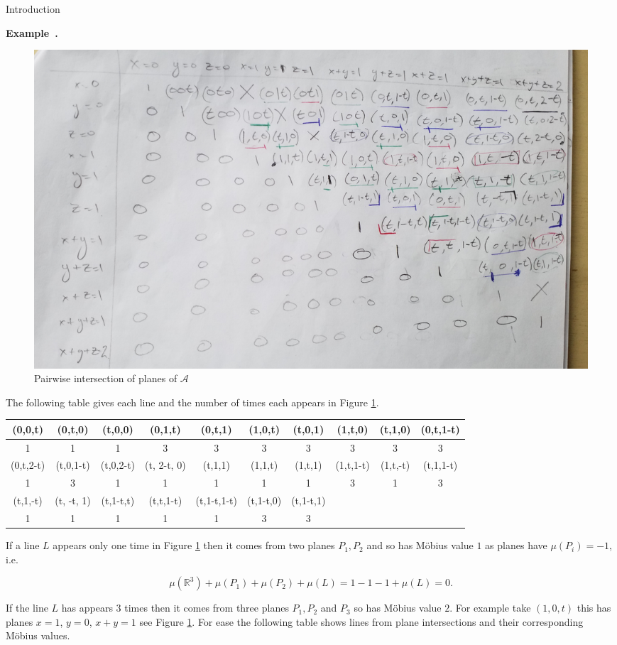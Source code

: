 \documentclass[a4paper,12pt]{article}
\newcounter{example}[]
\newenvironment{example}[1][]{\refstepcounter{example}\par\medskip
   \noindent \textbf{Example~\theexample. #1} \rmfamily}{\medskip}
\theoremstyle{definition}
\theoremstyle{indented}
\begin{document}
\begin{section}{Introduction}
\begin{example}
\begin{figure}[H]
    \centering
 \includegraphics[scale=0.10,angle=0]{29072020 pics/planesn4g1.jpg}  
    \caption{Pairwise intersection of planes of $\mathcal{A}$}
    \label{fig 2}
\end{figure}

The following table gives each line and the number of times each appears in Figure \ref{fig 2}.

\begin{center}
\begin{tabular}{ |c|c|c|c|c|c|c|c|c|c| } 
 \hline
(0,0,t)& (0,t,0)& (t,0,0) &(0,1,t) & (0,t,1) & (1,0,t) & (t,0,1) & (1,t,0) & (t,1,0)&  (0,t,1-t)   \\ 
\hline
1&1&1&3&3&3&3&3&3&3\\
\hline
(0,t,2-t) &(t,0,1-t) &(t,0,2-t) &(t, 2-t, 0)& (t,1,1) & (1,1,t)& (1,t,1)&  (1,t,1-t)&  (1,t,-t)& (t,1,1-t)\\
\hline
1&3&1&1&1&1&1&3&1&3\\ 
\hline
(t,1,-t) &(t, -t, 1)& (t,1-t,t) &(t,t,1-t) &(t,1-t,1-t) &(t,1-t,0)  &(t,1-t,1)& & &\\
\hline
  1&1&1&1&1&3&3 & & & \\
 \hline
\end{tabular}
  \caption{} \label{tab:sometab}
\end{center}

If a line $L$ appears only one time in Figure \ref{fig 2} then it comes from two planes $P_1,P_2$ and so has Möbius value $1$ as planes have $\mu(P_i)=-1$, i.e.

$$\mu(\mathbb{R}^3) + \mu(P_1) + \mu(P_2) + \mu(L)= 1 -1 -1 + \mu(L) = 0.$$

If the line $L$ has appears $3$ times then it comes from three planes $P_1,P_2$ and $P_3$ so has Möbius value $2$. For example take $(1,0,t)$ this has planes $x=1$, $y=0$, $x+y=1$ see Figure \ref{fig 2}. For ease the following table shows lines from plane intersections and their corresponding Möbius values.


\end{example}
\end{section}
\end{document}
